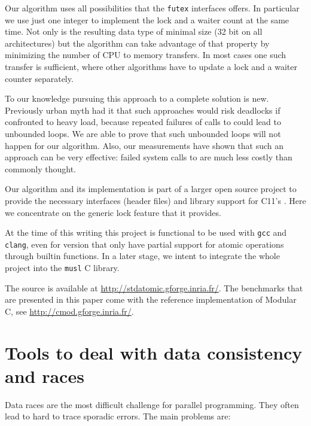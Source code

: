 Our algorithm uses all possibilities that the \texttt{futex} interfaces
offers. In particular we use just one  integer to
implement the lock and a waiter count at the same time. Not only is
the resulting data type of minimal size (32 bit on all
architectures) but the algorithm can take advantage of that property
by minimizing the number of CPU to memory transfers. In most cases
one such transfer is sufficient, where other algorithms have to
update a lock and a waiter counter separately.

To our knowledge pursuing this approach to a complete solution is
new. Previously urban myth had it that such approaches would risk
deadlocks if confronted to heavy load, because repeated failures of
calls to  could lead to unbounded loops. We are able to
prove that such unbounded loops will not happen for our algorithm.
Also, our measurements have shown that such an approach can be very
effective: failed system calls to  are much less costly
than commonly thought.

Our algorithm and its implementation is part of a larger open
source project to provide the necessary interfaces (header files)
and library support for C11's . Here we concentrate on
the generic lock feature that it provides.

At the time of this writing this project is functional to be used with
\texttt{gcc} and \texttt{clang}, even for version that only have partial
support for atomic operations through builtin functions.  In a later stage,
we intent to integrate the whole project into the \texttt{musl} C library.

The source is available at \url{http://stdatomic.gforge.inria.fr/}. The
benchmarks that are presented in this paper come with the reference
implementation of Modular C, see \url{http://cmod.gforge.inria.fr/}.

\section{Tools to deal with data consistency and races}
\label{sec-2}

Data races are the most difficult challenge for parallel
programming. They often lead to hard to trace sporadic errors.
\iflong
The main problems are:\itemadjust

